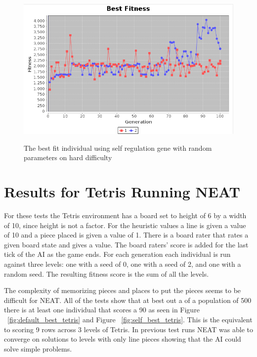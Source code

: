 \documentclass[12pt]{ucthesis} \newif\ifpdf \ifx\pdfoutput\undefined
\begin{document}
\begin{figure}[h!]
  \caption{The best fit individual using self regulation gene with random
  parameters on hard difficulty}
  \centering
    \includegraphics[width=1\textwidth]{graphsone/selfreg_random_best.png}
   \label{fig:selfreg_random_hard_best} 
\end{figure}


\section{Results for Tetris Running NEAT}
For these tests the Tetris environment has a board set to height of 6 by a width
of 10, since height is not a factor. For the heuristic values a line is given a
value of 10 and a piece placed is given a value of 1. There is a board rater
that rates a given board state and gives a value. The board raters' score is
added for the last tick of the AI as the game ends. For each generation each
individual is run against three levels: one with a seed of 0, one with a seed of
2, and one with a random seed. The resulting fitness score is the sum of all the
levels.

The complexity of memorizing pieces and places to put the pieces seems to be
difficult for NEAT. All of the tests show that at best out a of a population of
500 there is at least one individual that scores a 90 as seen in
Figure ~\ref{fig:default_best_tetris} and Figure ~\ref{fig:self_best_tetris}. This is the 
equivalent to scoring 9 rows across 3 levels of Tetris. In previous test runs
NEAT was able to converge on solutions to levels with only line pieces showing
that the AI could solve simple problems.
\end{document}
